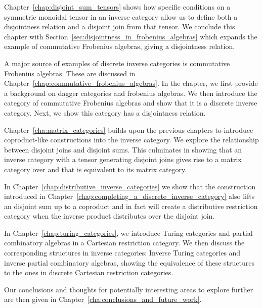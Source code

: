 Chapter~\ref{chap:disjoint_sum_tensors} shows how specific conditions on a symmetric monoidal
tensor in an inverse category allow us to define both a disjointness relation and a disjoint join
from that tensor. We conclude this chapter with Section~\ref{sec:disjointness_in_frobenius_algebras}
which expands the example of commutative Frobenius algebras, giving a disjointness relation.

A major source of examples of discrete inverse
categories is commutative Frobenius algebras. These are discussed in
Chapter~\ref{chap:commutative_frobenius_algebras}. In the chapter, we first provide
a background on dagger categories and frobenius algebras. We then introduce the category of
commutative Frobenius algebras and show that it is a discrete inverse category. Next, we show this
category has a disjointness relation.

Chapter~\ref{cha:matrix_categories} builds upon the previous chapters to introduce
coproduct-like constructions into the inverse
category. We explore the relationship between disjoint joins and
disjoint sums. This culminates in showing that an inverse category \X with a tensor generating disjoint
joins gives rise to a matrix category over \X and that \X is equivalent to its matrix
category.

In Chapter~\ref{chap:distributive_inverse_categories} we show that the
construction introduced in Chapter~\ref{chap:completing_a_discrete_inverse_category} also lifts an
disjoint sum up to a coproduct and in fact will create a distributive restriction category when the
inverse product distributes over the disjoint join.

In Chapter~\ref{chap:turing_categories}, we introduce Turing categories and partial combinatory
algebras in a Cartesian restriction category. We then discuss the corresponding structures in
inverse categories: Inverse Turing categories and inverse partial combinatory algebras, showing the
equivalence of these structures to the ones in discrete Cartesian restriction categories.

Our conclusions and thoughts for potentially interesting areas to explore further are then given in
Chapter~\ref{cha:conclusions_and_future_work}.



